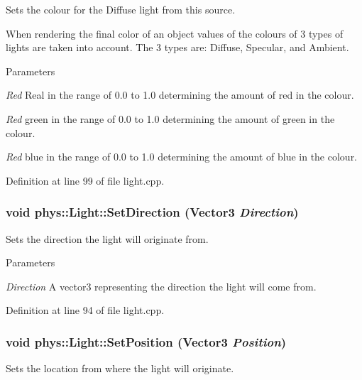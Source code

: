 Sets the colour for the Diffuse light from this source. 

When rendering the final color of an object values of the colours of 3 types of lights are taken into account. The 3 types are: Diffuse, Specular, and Ambient. 
\begin{DoxyParams}{Parameters}
\item[{\em Red}]Real in the range of 0.0 to 1.0 determining the amount of red in the colour. \item[{\em Red}]green in the range of 0.0 to 1.0 determining the amount of green in the colour. \item[{\em Red}]blue in the range of 0.0 to 1.0 determining the amount of blue in the colour. \end{DoxyParams}


Definition at line 99 of file light.cpp.

\hypertarget{classphys_1_1Light_a7020d242add6fe47939b3efb3b207f71}{
\subsubsection[{SetDirection}]{\setlength{\rightskip}{0pt plus 5cm}void phys::Light::SetDirection ({\bf Vector3} {\em Direction})}}
\label{dc/df1/classphys_1_1Light_a7020d242add6fe47939b3efb3b207f71}


Sets the direction the light will originate from. 


\begin{DoxyParams}{Parameters}
\item[{\em Direction}]A vector3 representing the direction the light will come from. \end{DoxyParams}


Definition at line 94 of file light.cpp.

\hypertarget{classphys_1_1Light_a9c2fcbd1f46ccac815ca7f1b00585c13}{
\subsubsection[{SetPosition}]{\setlength{\rightskip}{0pt plus 5cm}void phys::Light::SetPosition ({\bf Vector3} {\em Position})}}
\label{dc/df1/classphys_1_1Light_a9c2fcbd1f46ccac815ca7f1b00585c13}


Sets the location from where the light will originate. 


